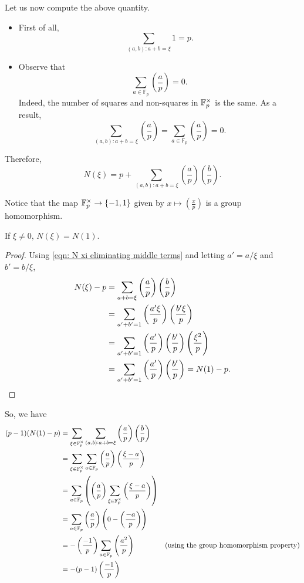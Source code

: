 \documentclass{article}
\begin{document}
		Let us now compute the above quantity.
		\begin{itemize}
			\item First of all,
			\[ \sum_{(a,b): a + b = \xi} 1 = p. \]

			\item Observe that
			\[ \sum_{a \in \mathbb{F}_p} \left(\frac{a}{p}\right) = 0. \]
			Indeed, the number of squares and non-squares in $\mathbb{F}_p^\times$ is the same. As a result,
			\[ \sum_{(a,b): a + b = \xi} \left(\frac{a}{p}\right) = \sum_{a\in\mathbb{F}_p} \left(\frac{a}{p}\right) = 0. \]
		\end{itemize}

		Therefore,
		\begin{equation}
			\label{eqn: N xi eliminating middle terms}
			N(\xi) = p + \sum_{(a,b) : a + b = \xi} \left(\frac{a}{p}\right) \left(\frac{b}{p}\right).
		\end{equation}

		Notice that the map $\mathbb{F}_p^\times \to \{-1,1\}$ given by $x \mapsto \left(\frac{x}{p}\right)$ is a group homomorphism.
		\clearpage

		\begin{lemma}
			If $\xi\ne 0$, $N(\xi) = N(1)$.
		\end{lemma}

		\begin{proof}
			Using \eqref{eqn: N xi eliminating middle terms} and letting $a' = a/\xi$ and $b'=b/\xi$,
			\begin{align*}
				N(\xi) - p &= \sum_{a+b=\xi} \left(\frac{a}{p}\right) \left(\frac{b}{p}\right) \\
				&= \sum_{a'+b'=1} \left(\frac{a'\xi}{p}\right) \left(\frac{b'\xi}{p}\right) \\
				&= \sum_{a'+b'=1} \left(\frac{a'}{p}\right) \left(\frac{b'}{p}\right) \left(\frac{\xi^2}{p}\right) \\
				&= \sum_{a'+b'=1} \left(\frac{a'}{p}\right) \left(\frac{b'}{p}\right) = N(1) - p. \qedhere
			\end{align*}
		\end{proof}

		So, we have
		\begin{align*}
			(p-1)(N(1) - p) &= \sum_{\xi\in\mathbb{F}_p^\times} \sum_{(a,b) : a+b=\xi} \left(\frac{a}{p}\right)\left(\frac{b}{p}\right) \\
			&= \sum_{\xi\in\mathbb{F}_p^\times} \sum_{a\in\mathbb{F}_p} \left(\frac{a}{p}\right) \left(\frac{\xi-a}{p}\right) \\
			&= \sum_{a\in\mathbb{F}_p} \left( \left(\frac{a}{p}\right) \sum_{\xi\in\mathbb{F}_p^\times} \left(\frac{\xi-a}{p}\right) \right) \\
			&= \sum_{a\in\mathbb{F}_p} \left(\frac{a}{p}\right) \left(0 - \left(\frac{-a}{p}\right)\right) \\
			&= -\left(\frac{-1}{p}\right) \sum_{a\in\mathbb{F}_p} \left(\frac{a^2}{p}\right) & \text{(using the group homomorphism property)} \\
			&= -(p-1)\left(\frac{-1}{p}\right)
		\end{align*}
\end{document}
